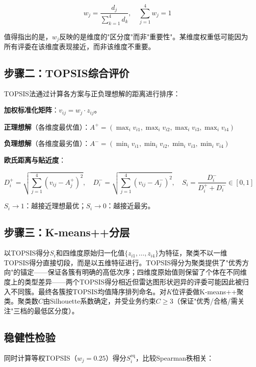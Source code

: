 \documentclass[UTF8,12pt]{ctexart}
\begin{document}
\begin{equation}
w_j = \frac{d_j}{\sum_{k=1}^{4} d_k}, \quad \sum_{j=1}^{4} w_j = 1
\end{equation}

值得指出的是，$w_j$反映的是维度的"区分度"而非"重要性"\cite{shannon1948}。某维度权重低可能因为所有评委在该维度表现接近，而非该维度不重要。

\subsection{步骤二：TOPSIS综合评价}

TOPSIS法\cite{hwang1981}通过计算各方案与正负理想解的距离进行排序：

\textbf{加权标准化矩阵}：$v_{ij} = w_j \cdot z_{ij}$。

\textbf{正理想解}（各维度最优值）：$A^+ = (\max_i v_{i1}, \max_i v_{i2}, \max_i v_{i3}, \max_i v_{i4})$

\textbf{负理想解}（各维度最劣值）：$A^- = (\min_i v_{i1}, \min_i v_{i2}, \min_i v_{i3}, \min_i v_{i4})$

\textbf{欧氏距离与贴近度}：

\begin{equation}
D_i^+ = \sqrt{\sum_{j=1}^{4} (v_{ij} - A_j^+)^2}, \quad
D_i^- = \sqrt{\sum_{j=1}^{4} (v_{ij} - A_j^-)^2}, \quad
S_i = \frac{D_i^-}{D_i^+ + D_i^-} \in [0,1]
\end{equation}

$S_i \to 1$：越接近理想最优；$S_i \to 0$：越接近最劣。

\subsection{步骤三：K-means++分层}

以TOPSIS得分$S_i$和四维度原始归一化值$\{z_{i1},\ldots,z_{i4}\}$为特征，聚类不以一维TOPSIS得分直接切段，而是以五维特征进行。TOPSIS得分为聚类提供了"优秀方向"的锚定——保证各簇有明确的高低次序；四维度原始值则保留了个体在不同维度上的类型差异——两个TOPSIS得分相近但雷达图形状迥异的评委可能因此被归入不同簇。最终各簇按TOPSIS均值降序排列命名。对$K$位评委做K-means++聚类\cite{arthur2007}。聚类数$C$由Silhouette系数确定，并受业务约束$C \geq 3$（保证"优秀/合格/需关注"三档的最低区分度）。

\subsection{稳健性检验}

同时计算等权TOPSIS（$w_j = 0.25$）得分$S_i^{\text{eq}}$，比较Spearman秩相关：
\end{document}
